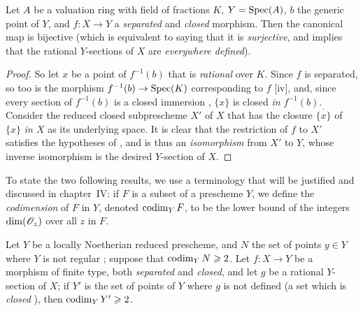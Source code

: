 \begin{proposition}[7.3.3]
\label{II.7.3.3}
Let $A$ be a valuation ring with field of fractions $K$, $Y=\operatorname{Spec}(A)$, $b$ the generic point of $Y$, and $f:X\to Y$ a \emph{separated} and \emph{closed} morphism.
Then the canonical map  is bijective (which is equivalent to saying that it is \emph{surjective}, and implies that the rational $Y$-sections of $X$ are \emph{everywhere defined}).
\end{proposition}

\begin{proof}
\label{proof-II.7.3.3}
So let $x$ be a point of $f^{-1}(b)$ that is \emph{rational} over $K$.
Since $f$ is separated, so too is the morphism $f^{-1}(b)\to\Spec(K)$ corresponding to $f$ [iv], and, since every section of $f^{-1}(b)$ is a closed immersion , $\{x\}$ is closed \emph{in $f^{-1}(b)$}.
Consider the reduced closed subprescheme $X'$ of $X$ that has the closure $\overline{\{x\}}$ of $\{x\}$ \emph{in $X$} as its underlying space.
It is clear that the restriction of $f$ to $X'$ satisfies the hypotheses of , and is thus an \emph{isomorphism} from $X'$ to $Y$, whose inverse isomorphism is the desired $Y$-section of $X$.
\end{proof}

\begin{env}[7.3.4]
\label{II.7.3.4}
To state the two following results, we use a terminology that will be justified and discussed in chapter~IV: if $F$ is a subset
of a prescheme $Y$, we define the \emph{codimension} of $F$ in $Y$, denoted $\operatorname{codim}_Y F$, to be the lower bound of the integers $\dim(\mathscr{O}_z)$ over all $z$ in $F$.
\end{env}

\begin{corollary}[7.3.5]
\label{II.7.3.5}
Let $Y$ be a locally Noetherian reduced prescheme, and $N$ the set of points $y\in Y$ where $Y$ is not regular ;
suppose that $\operatorname{codim}_Y N\geqslant2$.
Let $f:X\to Y$ be a morphism of finite type, both \emph{separated} and \emph{closed}, and let $g$ be a rational $Y$-section of $X$;
if $Y'$ is the set of points of $Y$ where $g$ is not defined (a set which is \emph{closed} ), then $\operatorname{codim}_Y Y'\geqslant2$.
\end{corollary}

